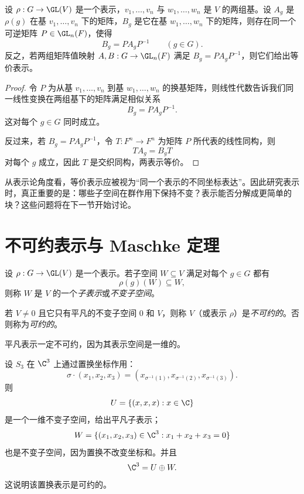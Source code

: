 \begin{proposition}
设 $\rho:G\to \GL(V)$ 是一个表示，$v_1,\dots,v_n$ 与 $w_1,\dots,w_n$ 是 $V$ 的两组基。设 $A_g$ 是 $\rho(g)$ 在基 $v_1,\dots,v_n$ 下的矩阵，$B_g$ 是它在基 $w_1,\dots,w_n$ 下的矩阵，则存在同一个可逆矩阵 $P\in \GL_n(F)$，使得
\[
B_g=PA_gP^{-1}\qquad (g\in G).
\]
反之，若两组矩阵值映射 $A,B:G\to \GL_n(F)$ 满足 $B_g=PA_gP^{-1}$，则它们给出等价表示。
\end{proposition}

\begin{proof}
令 $P$ 为从基 $v_1,\dots,v_n$ 到基 $w_1,\dots,w_n$ 的换基矩阵，则线性代数告诉我们同一线性变换在两组基下的矩阵满足相似关系
\[
B_g=PA_gP^{-1}.
\]
这对每个 $g\in G$ 同时成立。

反过来，若 $B_g=PA_gP^{-1}$，令 $T:F^n\to F^n$ 为矩阵 $P$ 所代表的线性同构，则
\[
TA_g=B_gT
\]
对每个 $g$ 成立，因此 $T$ 是交织同构，两表示等价。
\end{proof}

\begin{remark}
从表示论角度看，等价表示应被视为“同一个表示的不同坐标表达”。因此研究表示时，真正重要的是：哪些子空间在群作用下保持不变？表示能否分解成更简单的块？这些问题将在下一节开始讨论。
\end{remark}

\section{不可约表示与 Maschke 定理}

\begin{definition}
设 $\rho:G\to \GL(V)$ 是一个表示。若子空间 $W\subseteq V$ 满足对每个 $g\in G$ 都有
\[
\rho(g)(W)\subseteq W,
\]
则称 $W$ 是 $V$ 的一个\emph{子表示}或\emph{不变子空间}。

若 $V\neq 0$ 且它只有平凡的不变子空间 $0$ 和 $V$，则称 $V$（或表示 $\rho$）是\emph{不可约的}。否则称为\emph{可约的}。
\end{definition}

\begin{example}
平凡表示一定不可约，因为其表示空间是一维的。
\end{example}

\begin{example}
设 $S_3$ 在 $\C^3$ 上通过置换坐标作用：
\[
\sigma\cdot (x_1,x_2,x_3)=(x_{\sigma^{-1}(1)},x_{\sigma^{-1}(2)},x_{\sigma^{-1}(3)}).
\]
则
\[
U=\{(x,x,x):x\in \C\}
\]
是一个一维不变子空间，给出平凡子表示；
\[
W=\{(x_1,x_2,x_3)\in \C^3:x_1+x_2+x_3=0\}
\]
也是不变子空间，因为置换不改变坐标和。并且
\[
\C^3=U\oplus W.
\]
这说明该置换表示是可约的。
\end{example}

